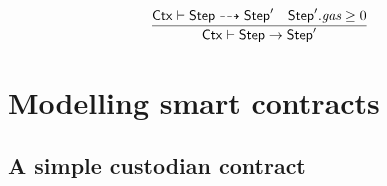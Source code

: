 \documentclass[12pt]{extarticle}
\begin{document}
\begin{equation}
\dfrac{
\mathsf{Ctx}\vdash\mathsf{Step}\dashrightarrow \mathsf{Step}' \quad \mathsf{Step}'.\textit{gas} \geq 0
}{
\mathsf{Ctx}\vdash\mathsf{Step}\to \mathsf{Step}'
}
\end{equation}

\newpage 

\newpage

\newpage


\section{Modelling smart contracts}

\subsection{A simple custodian contract}



\end{document}
